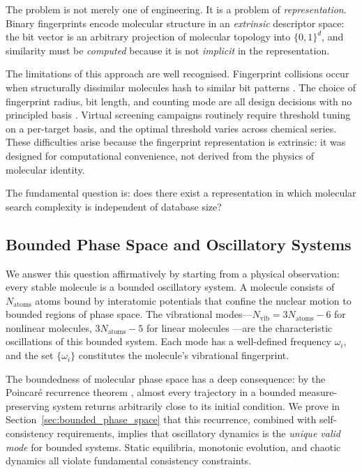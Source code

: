 \documentclass[11pt,a4paper]{article}
\theoremstyle{definition}
\theoremstyle{remark}
\newcommand{\Nvib}{N_{\mathrm{vib}}}
\begin{document}
The problem is not merely one of engineering. It is a problem of \emph{representation}. Binary fingerprints encode molecular structure in an \emph{extrinsic} descriptor space: the bit vector is an arbitrary projection of molecular topology into $\{0,1\}^d$, and similarity must be \emph{computed} because it is not \emph{implicit} in the representation.

The limitations of this approach are well recognised. Fingerprint collisions occur when structurally dissimilar molecules hash to similar bit patterns \citep{riniker2013}. The choice of fingerprint radius, bit length, and counting mode are all design decisions with no principled basis \citep{bajusz2015}. Virtual screening campaigns routinely require threshold tuning on a per-target basis, and the optimal threshold varies across chemical series. These difficulties arise because the fingerprint representation is extrinsic: it was designed for computational convenience, not derived from the physics of molecular identity.

The fundamental question is: does there exist a representation in which molecular search complexity is independent of database size?

\subsection{Bounded Phase Space and Oscillatory Systems}

We answer this question affirmatively by starting from a physical observation: every stable molecule is a bounded oscillatory system. A molecule consists of $N_{\mathrm{atoms}}$ atoms bound by interatomic potentials that confine the nuclear motion to bounded regions of phase space. The vibrational modes---$\Nvib = 3N_{\mathrm{atoms}} - 6$ for nonlinear molecules, $3N_{\mathrm{atoms}} - 5$ for linear molecules \citep{wilson1955}---are the characteristic oscillations of this bounded system. Each mode has a well-defined frequency $\omega_i$, and the set $\{\omega_i\}$ constitutes the molecule's vibrational fingerprint.

The boundedness of molecular phase space has a deep consequence: by the Poincar\'e recurrence theorem \citep{poincare1890}, almost every trajectory in a bounded measure-preserving system returns arbitrarily close to its initial condition. We prove in Section~\ref{sec:bounded_phase_space} that this recurrence, combined with self-consistency requirements, implies that oscillatory dynamics is the \emph{unique valid mode} for bounded systems. Static equilibria, monotonic evolution, and chaotic dynamics all violate fundamental consistency constraints.
\end{document}

